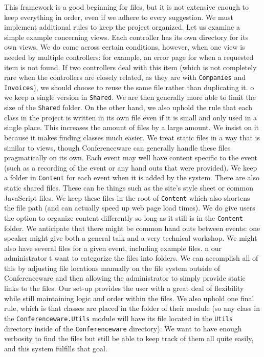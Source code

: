 \documentclass[12pt]{article}
\begin{document}
This framework is a good beginning for files, but it is not extensive enough to keep everything in order, even if we adhere to every suggestion. We must implement additional rules to keep the project organized. Let us examine a simple example concerning views. Each controller has its own directory for its own views. We do come across certain conditions, however, when one view is needed by multiple controllers: for example, an error page for when a requested item is not found. If two controllers deal with this item (which is not completely rare when the controllers are closely related, as they are with \texttt{Companies} and \texttt{Invoices}), we should choose to reuse the same file rather than duplicating it. o we keep a single version in \texttt{Shared}. We are then generally more able to limit the size of the \texttt{Shared} folder. On the other hand, we also uphold the rule that each class in the project is written in its own file even if it is small and only used in a single place. This increases the amount of files by a large amount. We insist on it because it makes finding classes much easier. We treat static files in a way that is similar to views, though Conferenceware can generally handle these files pragmatically on its own. Each event may well have content specific to the event (such as a recording of the event or any hand outs that were provided). We keep a folder in \texttt{Content} for each event when it is added by the system. There are also static shared files. These can be things such as the site's style sheet or common JavaScript files. We keep these files in the root of \texttt{Content} which also shortens the file path (and can actually speed up web page load times). We do give users the option to organize content differently so long as it still is in the \texttt{Content} folder. We anticipate that there might be common hand outs between events: one speaker might give both a general talk and a very technical workshop. We might also have several files for a given event, including example files. n our administrator t want to categorize the files into folders. We can accomplish all of this by adjusting file locations manually on the file system outside of Conferenceware and then allowing the administrator to simply provide static links to the files. Our set-up provides the user with a great deal of flexibility while still maintaining logic and order within the files. We also uphold one final rule, which is that classes are placed in the folder of their module (so any class in the \texttt{Conferenceware.Utils} module will have its file located in the \texttt{Utils} directory inside of the \texttt{Conferenceware} directory). We want to have enough verbosity to find the files but still be able to keep track of them all quite easily, and this system fulfills that goal.
\end{document}
